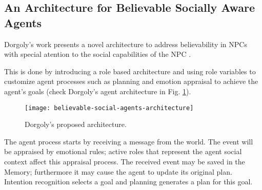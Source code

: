 \subsection{An Architecture for Believable Socially Aware Agents}
\label{sec:dorgoly}
Dorgoly's work presents a novel architecture to address believability in \ac{NPC}s with special atention to the social capabilities of the \ac{NPC} \cite{dorgoly:social-agents}.

This is done by introducing a role based architecture and using role variables to customize agent processes such as planning and emotion appraisal to achieve the agent's goals (check Dorgoly's agent architecture in Fig. \ref{fig:believable-social-agents-architecture}).

\begin{figure}
  \centering
    \texttt{[image: believable-social-agents-architecture]}
  \caption{Dorgoly's proposed architecture.}
  \label{fig:believable-social-agents-architecture}
\end{figure}

The agent process starts by receiving a message from the world.
The event will be appraised by emotional rules; active roles that represent the agent social context affect this appraisal process.
The received event may be saved in the Memory; furthermore it may cause the agent to update its original plan.
Intention recognition selects a goal and planning generates a plan for this goal.

